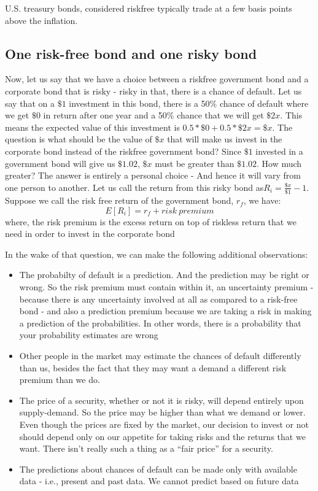 U.S. treasury bonds, considered riskfree typically trade at a few basis points above the inflation.  

\subsection{One risk-free bond and one risky bond}
Now, let us say that we have a choice between a riskfree government bond and a corporate bond that is risky - risky in that, there is a chance of default. Let us say that on a \(\$1\) investment in this bond, there is a 50\% chance of default where we get \(\$0\) in return after one year and a 50\% chance that we will get \(\$2x\). This means the expected value of this investment is \(0.5*\$0 + 0.5*\$2x = \$x\). The question is what should be the value of \(\$x\) that will make us invest in the corporate bond instead of the riskfree government bond? Since \(\$1\) invested in a government bond will give us \(\$1.02\), \(\$x\) must be greater than \(\$1.02\). How much greater? The answer is entirely a personal choice - And hence it will vary from one person to another. Let us call the return from this risky bond as\(R_i = \frac{\$x}{\$1} - 1\). Suppose we call the risk free return of the government bond, \(r_f\), we have:
	\[ E[R_i] = r_f + risk\ premium \]
where, the risk premium is the excess return on top of riskless return that we need in order to invest in the corporate bond

In the wake of that question, we can make the following additional observations:
	\begin{itemize}
	\item The probabilty of default is a prediction. And the prediction may be right or wrong. So the risk premium must contain within it, an uncertainty premium - because there is any uncertainty involved at all as compared to a risk-free bond - and also a prediction premium because we are taking a risk in making a prediction of the probabilities. In other words, there is a probability that your probability estimates are wrong
	\item Other people in the market may estimate the chances of default differently than us, besides the fact that they may want a demand a different risk premium than we do. 
	\item The price of a security, whether or not it is risky, will depend entirely upon supply-demand. So the price may be higher than what we demand or lower. Even though the prices are fixed by the market, our decision to invest or not should depend only on our appetite for taking risks and the returns that we want. There isn't really such a thing as a ``fair price'' for a security. 
	\item The predictions about chances of default can be made only with available data - i.e., present and past data. We cannot predict based on future data
	\end{itemize}
	
